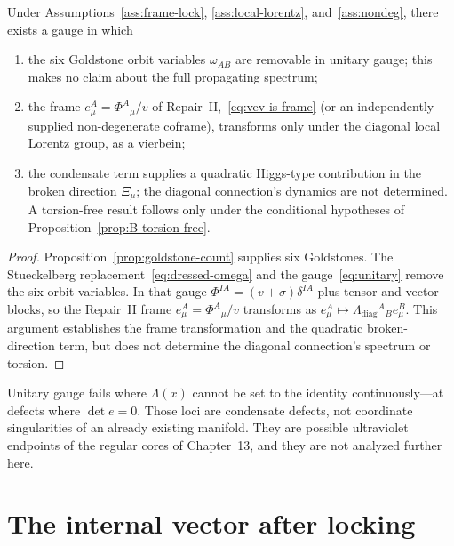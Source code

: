 \begin{theorem}
  \label{thm:locking}
  Under Assumptions~\ref{ass:frame-lock},
  \ref{ass:local-lorentz}, and~\ref{ass:nondeg}, there exists a
  gauge in which
  \begin{enumerate}
    \item the six Goldstone orbit variables \(\omega_{AB}\) are
          removable in unitary gauge; this makes no claim about the
          full propagating spectrum;
    \item the frame \(e^A_\mu=\Phi^A{}_\mu/v\) of
          Repair~II,~\eqref{eq:vev-is-frame} (or an independently
          supplied non-degenerate coframe), transforms only under
          the diagonal local Lorentz group, as a vierbein;
    \item the condensate term supplies a quadratic Higgs-type
          contribution in the broken direction \(\Xi_\mu\); the
          diagonal connection's dynamics are not determined. A
          torsion-free result follows only under the conditional
          hypotheses of Proposition~\ref{prop:B-torsion-free}.
  \end{enumerate}
\end{theorem}

\begin{proof}
  Proposition~\ref{prop:goldstone-count} supplies six Goldstones.
  The Stueckelberg replacement~\eqref{eq:dressed-omega} and the
  gauge~\eqref{eq:unitary} remove the six orbit variables. In that
  gauge \(\Phi^{IA}=(v+\sigma)\delta^{IA}\) plus tensor and vector
  blocks, so the Repair~II frame \(e^A_\mu=\Phi^A{}_\mu/v\) transforms
  as \(e^A_\mu\mapsto\Lambda_{\mathrm{diag}}{}^A{}_B e^B_\mu\).
  This argument establishes the frame transformation and the
  quadratic broken-direction term, but does not determine the
  diagonal connection's spectrum or torsion.
\end{proof}

\begin{remark}[Defects]
  Unitary gauge fails where \(\Lambda(x)\) cannot be set to the
  identity continuously---at defects where \(\det e=0\). Those loci
  are condensate defects, not coordinate singularities of an
  already existing manifold. They are possible ultraviolet
  endpoints of the regular cores of Chapter~13, and they are not
  analyzed further here.
\end{remark}

\section{The internal vector after locking}
\label{sec:ch10-vector}

